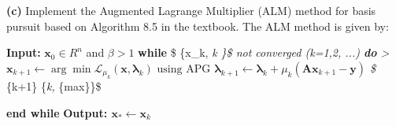 \documentclass[11pt]{article}
\begin{document}
    \textbf{(c)} Implement the Augmented Lagrange Multiplier (ALM) method
for basis pursuit based on Algorithm 8.5 in the textbook. The ALM method
is given by:

\textbf{Input:} \(\boldsymbol x_0 \in R^n\) and \(\beta > 1\)
\textbf{while} \$ \{\boldsymbol x\_k, \boldsymbol \lambda\emph{k \}\$
not converged (k=1,2, ...) \textbf{do} \textgreater{}
\(\boldsymbol x_{k+1} \leftarrow \arg \min \mathcal{L}_{\mu_k} (\boldsymbol x, \boldsymbol \lambda_k) \text{ using APG}\)
\(\boldsymbol \lambda_{k+1} \leftarrow \boldsymbol \lambda_k + \mu_k (\boldsymbol A \boldsymbol x_{k+1} - \boldsymbol y)\)
\$ \mu}\{k+1\} \leftarrow {}\{\beta \mu\emph{k, \mu}\{max\}\}\$

\textbf{end while} \textbf{Output:
\(\boldsymbol x_* \leftarrow \boldsymbol x_k\)}
\end{document}
